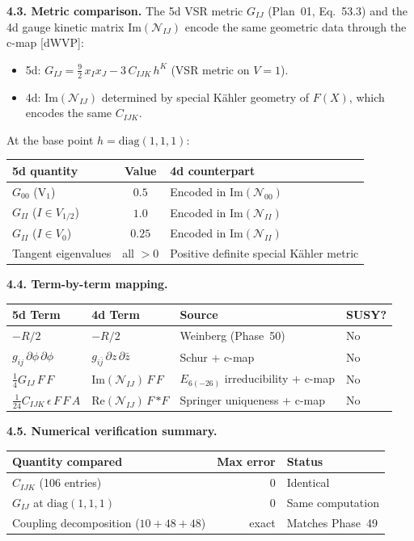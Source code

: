 \textbf{4.3. Metric comparison.}
The 5d VSR metric $G_{IJ}$ (Plan~01, Eq.~53.3) and the 4d gauge
kinetic matrix $\mathrm{Im}(\mathcal{N}_{IJ})$ encode the same
geometric data through the c-map [dWVP]:
\begin{itemize}
  \item 5d: $G_{IJ} = \tfrac{9}{2}\,x_I x_J - 3\,C_{IJK}\,h^K$
    (VSR metric on $V = 1$).
  \item 4d: $\mathrm{Im}(\mathcal{N}_{IJ})$ determined by special
    K\"ahler geometry of $F(X)$, which encodes the same $C_{IJK}$.
\end{itemize}
At the base point $h = \mathrm{diag}(1,1,1)$:
\begin{center}
\begin{tabular}{lcl}
\hline
5d quantity & Value & 4d counterpart \\
\hline
$G_{00}$ (V$_1$) & $0.5$ & Encoded in $\mathrm{Im}(\mathcal{N}_{00})$ \\
$G_{II}$ ($I \in V_{1/2}$) & $1.0$ & Encoded in $\mathrm{Im}(\mathcal{N}_{II})$ \\
$G_{II}$ ($I \in V_0$) & $0.25$ & Encoded in $\mathrm{Im}(\mathcal{N}_{II})$ \\
Tangent eigenvalues & all $> 0$ & Positive definite special K\"ahler metric \\
\hline
\end{tabular}
\end{center}

\textbf{4.4. Term-by-term mapping.}

\begin{center}
\begin{tabular}{llll}
\hline
5d Term & 4d Term & Source & SUSY? \\
\hline
$-R/2$ & $-R/2$ & Weinberg (Phase~50) & No \\
$g_{ij}\,\partial\phi\,\partial\phi$ & $g_{i\bar{j}}\,\partial z\,\partial\bar{z}$
  & Schur + c-map & No \\
$\frac{1}{4} G_{IJ}\,F\,F$ & $\mathrm{Im}(\mathcal{N}_{IJ})\,F\,F$
  & $E_{6(-26)}$ irreducibility + c-map & No \\
$\frac{1}{24} C_{IJK}\,\epsilon\,F\,F\,A$ & $\mathrm{Re}(\mathcal{N}_{IJ})\,F\,{*F}$
  & Springer uniqueness + c-map & No \\
\hline
\end{tabular}
\end{center}

\textbf{4.5. Numerical verification summary.}

\begin{center}
\begin{tabular}{lrl}
\hline
Quantity compared & Max error & Status \\
\hline
$C_{IJK}$ (106 entries) & $0$ & Identical \\
$G_{IJ}$ at $\mathrm{diag}(1,1,1)$ & $0$ & Same computation \\
Coupling decomposition ($10+48+48$) & exact & Matches Phase~49 \\
\hline
\end{tabular}
\end{center}


